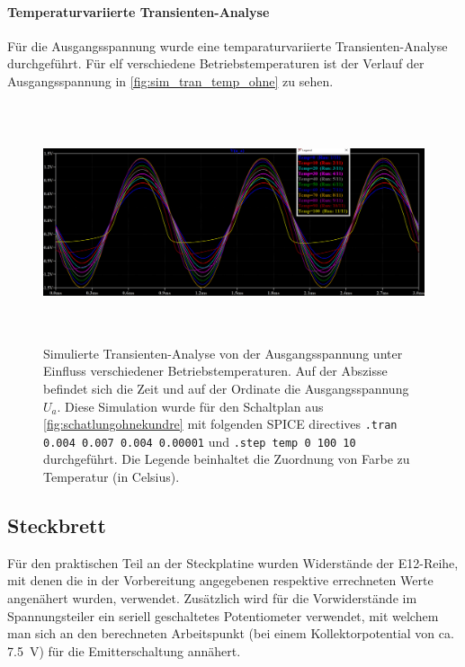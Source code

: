 \documentclass[12pt,english,ngerman]{scrartcl}
\begin{document}
\paragraph{Temperaturvariierte Transienten-Analyse}
Für die Ausgangsspannung wurde eine temparaturvariierte Transienten-Analyse durchgeführt. Für elf verschiedene Betriebstemperaturen ist der Verlauf der Ausgangsspannung in \autoref{fig:sim_tran_temp_ohne} zu sehen.
\begin{figure}[H]
  \centering
    \includegraphics[width=\linewidth, height=7cm]{./figures/ohnekondundre/image.png }
    \caption[Simulierte Transienten-Analyse mit
    Überbrückungskondensator]{Simulierte Transienten-Analyse von der
      Ausgangsspannung unter Einfluss verschiedener Betriebstemperaturen. Auf
      der Abszisse befindet sich die Zeit und auf der Ordinate die
      Ausgangsspannung $U_a$. Diese Simulation wurde für den Schaltplan aus
    \autoref{fig:schatlungohnekundre} mit folgenden SPICE directives \texttt{.tran 0.004 0.007 0.004 0.00001} und \texttt{.step temp 0 100 10} durchgeführt. Die Legende
    beinhaltet die Zuordnung von Farbe zu Temperatur (in Celsius).}
  \label{fig:sim_tran_temp_ohne_ohne_re}
\end{figure}

\subsection{Steckbrett}
Für den praktischen Teil an der Steckplatine wurden Widerstände der E12-Reihe, mit denen
die in der Vorbereitung angegebenen respektive errechneten Werte angenähert wurden,
verwendet. Zusätzlich wird für die Vorwiderstände im Spannungsteiler ein
seriell geschaltetes Potentiometer verwendet, mit welchem man sich an den
berechneten Arbeitspunkt (bei einem Kollektorpotential von ca. \SI{7,5}{\volt}) für die Emitterschaltung annähert. 
\end{document}
